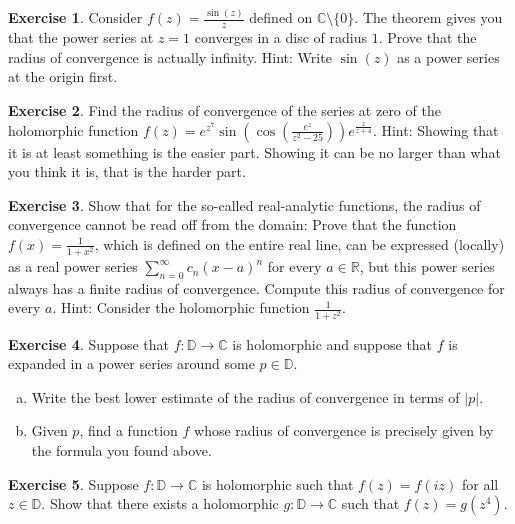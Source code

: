 \documentclass[12pt,openany]{book}
\newcommand{\sabs}[1]{\lvert {#1} \rvert}
\newcommand{\C}{{\mathbb{C}}}
\newcommand{\R}{{\mathbb{R}}}
\newcommand{\D}{{\mathbb{D}}}
\theoremstyle{plain}
\theoremstyle{remark}
\theoremstyle{definition}
\newenvironment{exbox}{%
    \def\FrameCommand{\vrule width 1pt \relax\hspace{10pt}}%
    \MakeFramed{\advance\hsize-\width\FrameRestore}%
}{%
    \endMakeFramed
}
\newenvironment{exparts}{%
    \leavevmode\begin{enumerate}[a),noitemsep,topsep=0pt,parsep=0pt,partopsep=0pt]
}{%
    \end{enumerate}
}
\theoremstyle{exercise}
\newtheorem{exercise}{Exercise}[section]
\theoremstyle{example}
\begin{document}
\begin{exbox}
\begin{exercise}
Consider $f(z) = \frac{\sin(z)}{z}$ defined on $\C \setminus \{ 0 \}$.
The theorem gives you that the power series at $z=1$ converges in a disc of
radius $1$.  Prove that the radius of convergence is actually infinity.  Hint:
Write $\sin(z)$ as a power series at the origin first.
\end{exercise}

\begin{exercise}
Find the radius of convergence of the series at zero of the holomorphic
function $f(z) =
e^{z^7}\sin\left(\cos\left(\frac{e^z}{z^2-25}\right)\right)e^{\frac{z}{z+4}}$.
Hint: Showing that it is at least something is the easier part.
Showing it
can be no larger than what you think it is, that is the harder part.
\end{exercise}

\begin{exercise}\label{exercise:realradconvhard}
\pagebreak[2]
Show that for the so-called real-analytic functions, the radius of
convergence cannot be read off from the domain:
Prove that the function $f(x) = \frac{1}{1+x^2}$,
which is defined on the
entire real line, can be expressed (locally) as a real power series
$\sum_{n=0}^\infty c_n {(x-a)}^n$ for every $a \in \R$, but
this power series always has a finite radius of convergence.
Compute this radius of convergence for every $a$.  Hint: Consider
the holomorphic function $\frac{1}{1+z^2}$.
\end{exercise}

\begin{exercise}
\pagebreak[3]
Suppose that $f \colon \D \to \C$ is holomorphic and suppose that
$f$ is expanded in a power series around some $p \in \D$.
\begin{exparts}
\item
Write the best lower estimate of the radius of convergence in terms of
$\sabs{p}$.
\item
Given $p$, find a function $f$ whose radius of convergence is precisely
given by the formula you found above.
\end{exparts}
\end{exercise}

\begin{exercise}
\pagebreak[3]
Suppose $f \colon \D \to \C$ is holomorphic such that
$f(z) = f(iz)$ for all $z \in \D$.  Show that there
exists a holomorphic $g \colon \D \to \C$ such that
$f(z) = g(z^4)$.
\end{exercise}


\end{exbox}
\end{document}
